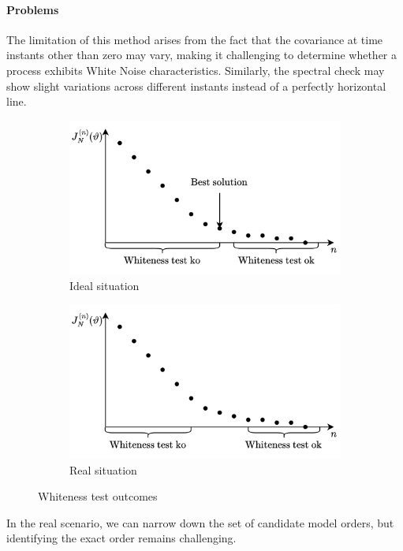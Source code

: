 \paragraph*{Problems}
The limitation of this method arises from the fact that the covariance at time instants other than zero may vary, making it challenging to determine whether a process exhibits  White Noise characteristics.
Similarly, the spectral check may show slight variations across different instants instead of a perfectly horizontal line.
\begin{figure}[H]
    \centering
    \begin{subfigure}{0.49\textwidth}
        \centering
        \includegraphics[width=0.9\linewidth]{images/wone.png} 
        \caption{Ideal situation}
    \end{subfigure}
    \begin{subfigure}{0.49\textwidth}
        \centering
        \includegraphics[width=0.9\linewidth]{images/wtwo.png}
        \caption{Real situation}
    \end{subfigure}
    \caption{Whiteness test outcomes}
\end{figure}
In the real scenario, we can narrow down the set of candidate model orders, but identifying the exact order remains challenging.

